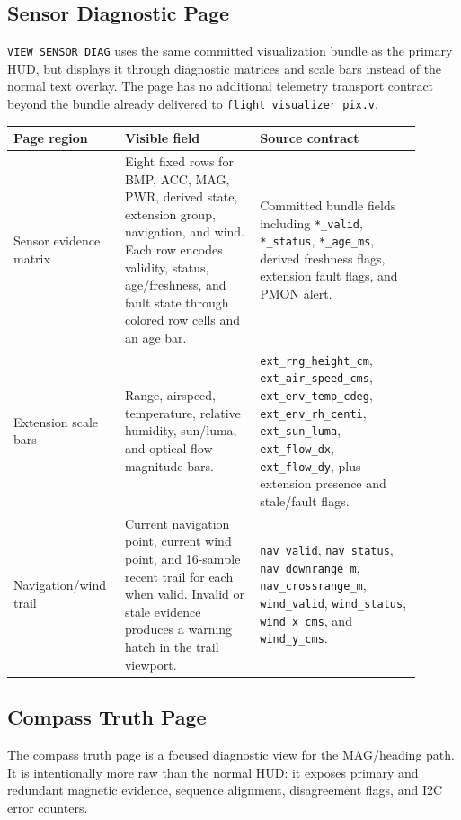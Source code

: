 \documentclass{article}
\newcommand{\sig}[1]{\begingroup\nolinkurl{#1}\endgroup}
\newcommand{\file}[1]{\begingroup\nolinkurl{#1}\endgroup}
\begin{document}
\subsection{Sensor Diagnostic Page}

\sig{VIEW_SENSOR_DIAG} uses the same committed visualization bundle as the
primary HUD, but displays it through diagnostic matrices and scale bars instead
of the normal text overlay.  The page has no additional telemetry transport
contract beyond the bundle already delivered to \file{flight_visualizer_pix.v}.

\begin{longtable}{p{0.22\linewidth} p{0.31\linewidth} p{0.37\linewidth}}
\toprule
\textbf{Page region} & \textbf{Visible field} & \textbf{Source contract} \\
\midrule
\endhead
Sensor evidence matrix &
Eight fixed rows for BMP, ACC, MAG, PWR, derived state, extension group,
navigation, and wind.  Each row encodes validity, status, age/freshness, and
fault state through colored row cells and an age bar. &
Committed bundle fields including \sig{*_valid}, \sig{*_status},
\sig{*_age_ms}, derived freshness flags, extension fault flags, and PMON alert. \\

Extension scale bars &
Range, airspeed, temperature, relative humidity, sun/luma, and optical-flow
magnitude bars. &
\sig{ext_rng_height_cm}, \sig{ext_air_speed_cms}, \sig{ext_env_temp_cdeg},
\sig{ext_env_rh_centi}, \sig{ext_sun_luma}, \sig{ext_flow_dx},
\sig{ext_flow_dy}, plus extension presence and stale/fault flags. \\

Navigation/wind trail &
Current navigation point, current wind point, and 16-sample recent trail for
each when valid.  Invalid or stale evidence produces a warning hatch in the
trail viewport. &
\sig{nav_valid}, \sig{nav_status}, \sig{nav_downrange_m},
\sig{nav_crossrange_m}, \sig{wind_valid}, \sig{wind_status},
\sig{wind_x_cms}, and \sig{wind_y_cms}. \\
\bottomrule
\end{longtable}

\subsection{Compass Truth Page}

The compass truth page is a focused diagnostic view for the MAG/heading path.
It is intentionally more raw than the normal HUD: it exposes primary and
redundant magnetic evidence, sequence alignment, disagreement flags, and I2C
error counters.
\end{document}
